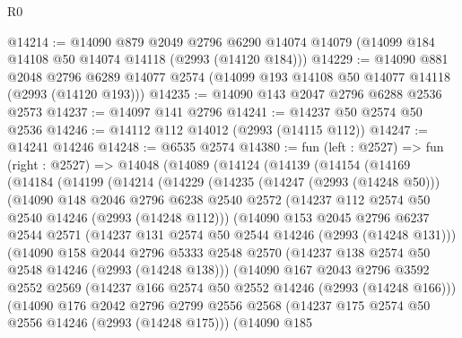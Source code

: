 \begin{lexlean}{R0}
\begin{coremodule}
@14214 := @14090
    @879
    @2049
    @2796
    @6290
    @14074
    @14079
    (@14099 @184 @14108 @50 @14074 @14118 (@2993 (@14120 @184)))
@14229 := @14090
    @881
    @2048
    @2796
    @6289
    @14077
    @2574
    (@14099 @193 @14108 @50 @14077 @14118 (@2993 (@14120 @193)))
@14235 := @14090 @143 @2047 @2796 @6288 @2536 @2573
@14237 := @14097 @141 @2796
@14241 := @14237 @50 @2574 @50 @2536
@14246 := @14112 @112 @14012 (@2993 (@14115 @112))
@14247 := @14241 @14246
@14248 := @6535 @2574
@14380 := fun (left : @2527) =>
  fun (right : @2527) =>
  @14048
    (@14089
      (@14124
        (@14139
          (@14154
            (@14169
              (@14184
                (@14199
                  (@14214
                    (@14229
                      (@14235
                        (@14247 (@2993 (@14248 @50)))
                        (@14090
                          @148
                          @2046
                          @2796
                          @6238
                          @2540
                          @2572
                          (@14237 @112 @2574 @50 @2540 @14246 (@2993 (@14248 @112)))
                          (@14090
                            @153
                            @2045
                            @2796
                            @6237
                            @2544
                            @2571
                            (@14237 @131 @2574 @50 @2544 @14246 (@2993 (@14248 @131)))
                            (@14090
                              @158
                              @2044
                              @2796
                              @5333
                              @2548
                              @2570
                              (@14237 @138 @2574 @50 @2548 @14246 (@2993 (@14248 @138)))
                              (@14090
                                @167
                                @2043
                                @2796
                                @3592
                                @2552
                                @2569
                                (@14237 @166 @2574 @50 @2552 @14246 (@2993 (@14248 @166)))
                                (@14090
                                  @176
                                  @2042
                                  @2796
                                  @2799
                                  @2556
                                  @2568
                                  (@14237 @175 @2574 @50 @2556 @14246 (@2993 (@14248 @175)))
                                  (@14090
                                    @185

\end{coremodule}
\end{lexlean}
